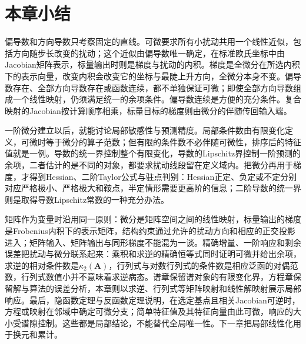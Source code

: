 



\FloatBarrier
\section{本章小结}
\label{sec:multivariable-differentiation-summary}

偏导数和方向导数只考察固定的直线。可微要求所有小扰动共用一个线性近似，包括方向随步长改变的扰动；这个近似由偏导数唯一确定，在标准欧氏坐标中由Jacobian矩阵表示，标量输出时则是梯度与扰动的内积。梯度是全微分在所选内积下的表示向量，改变内积会改变它的坐标与最陡上升方向，全微分本身不变。偏导数存在、全部方向导数存在或函数连续，都不单独保证可微；即使全部方向导数组成一个线性映射，仍须满足统一的余项条件。偏导数连续是方便的充分条件。复合映射的Jacobian按计算顺序相乘，标量目标的梯度则由微分的伴随传回输入端。

一阶微分建立以后，就能讨论局部敏感性与预测精度。局部条件数由有限变化定义，可微时等于微分的算子范数；但有限的条件数不必伴随可微性，排序后的特征值就是一例。导数的统一界控制整个有限变化，导数的Lipschitz界控制一阶预测的余项，二者估计的是不同的对象，都要求扰动线段留在定义域内。把微分再用于梯度，才得到Hessian、二阶Taylor公式与驻点判别：Hessian正定、负定或不定分别对应严格极小、严格极大和鞍点，半定情形需要更高阶的信息；二阶导数的统一界则是取得导数Lipschitz常数的一种充分办法。

矩阵作为变量时沿用同一原则：微分是矩阵空间之间的线性映射，标量输出的梯度是Frobenius内积下的表示矩阵，结构约束通过允许的扰动方向和相应的正交投影进入；矩阵输入、矩阵输出与同形梯度不能混为一谈。精确增量、一阶响应和剩余误差把扰动与微分联系起来：乘积和求逆的精确恒等式同时证明可微并给出余项，求逆的相对条件数是$\kappa_2(\bm A)$，行列式与对数行列式的条件数是相应泛函的对偶范数，行列式数值小并不意味着求逆病态。谱章保留谱对象的有限变化界，方程章保留解与算法的误差分析，本章则以求逆、行列式等矩阵映射和线性解映射展示局部响应。最后，隐函数定理与反函数定理说明，在选定基点且相关Jacobian可逆时，方程或映射在邻域中确定可微分支；简单特征值及其特征向量由此可微，响应的大小受谱隙控制。这些都是局部结论，不能替代全局唯一性。下一章把局部线性化用于换元和累计。
